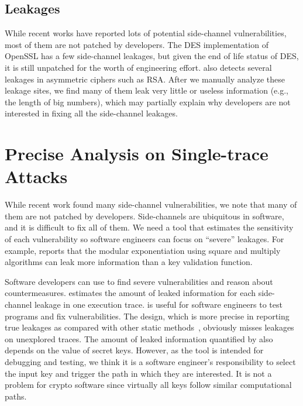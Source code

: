 \subsection*{Leakages} While recent works have reported lots of potential side-channel vulnerabilities, most of them are not patched by developers. The DES implementation of OpenSSL has a few side-channel leakages, but given the end of life status of DES, it is still unpatched for the worth of engineering effort. \detect{} also detects several leakages in asymmetric ciphers such as RSA. After we manually analyze these leakage sites, we find many of them leak very little or useless information (e.g., the length of big numbers), which may partially explain why developers are not interested in fixing all the side-channel leakages. 

\section{Precise Analysis on Single-trace Attacks}
While recent work found many side-channel vulnerabilities,
we note that many of them are not patched by developers.
Side-channels are ubiquitous in software, and it is difficult to fix all of them.
We need a tool that estimates the sensitivity of each vulnerability
so software engineers can focus on
``severe'' leakages. For example, \tool{} reports that
the modular exponentiation using square and multiply algorithms can
leak more information than a key validation function.

Software developers can use \tool{} to find severe vulnerabilities
and reason about countermeasures.
\tool{} estimates the amount of leaked information for each side-channel leakage
in one execution trace. \tool{} is useful for software
engineers to test programs and fix vulnerabilities.
The design, which is more precise in reporting true leakages as compared with other static
methods~\cite{197207,BacelarAlmeida:2013:FVS:2483313.2483334}, obviously misses leakages on unexplored traces. The amount of leaked information quantified by \tool{} also depends on the value of secret keys.
However, as the tool is intended for debugging and testing,
we think it is a software engineer's responsibility to select the input key and trigger
the path in which they are interested. It is not a problem for crypto software 
since virtually all keys follow similar computational paths.

